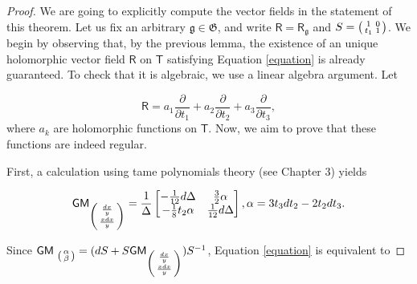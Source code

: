 \documentclass[10pt,a4paper]{amsart}
\begin{document}
\begin{proof}
We are going to explicitly compute the vector fields in the statement of this theorem. Let us fix an arbitrary $\mathfrak{g}\in \mathfrak{G}$, and write $\mathsf{R}=\mathsf{R}_{\mathfrak{g}}$ and $S=\begin{psmallmatrix}1 & 0\\  t_1 & 1\end{psmallmatrix}$. We begin by observing that, by the previous lemma, the existence of an unique holomorphic vector field $\mathsf{R}$ on $\mathsf{T}$ satisfying Equation \ref{equation} is already guaranteed. To check that it is algebraic, we use a linear algebra argument. Let 

\begin{equation}
\mathsf{R}=a_1\frac{\partial}{\partial t_1}+ a_2\frac{\partial}{\partial t_2}+a_3\frac{\partial}{\partial t_3}, 
\end{equation} 
where $a_k$ are holomorphic functions on $\mathsf{T}$. Now, we aim to prove that these functions are indeed regular.

First, a calculation using tame polynomials theory (see Chapter 3) yields

\begin{equation}
\mathsf{GM}_{\begin{psmallmatrix}\frac{dx}{y}\\ \frac{xdx}{y}\end{psmallmatrix}}=
\frac{1}{\Delta}\begin{bmatrix}
-\frac{1}{12}d\Delta & \frac{3}{2} \alpha\\
-\frac{1}{8}t_2\alpha & \frac{1}{12}d\Delta 
\end{bmatrix}, \alpha=3t_3dt_2-2t_2dt_3.
\end{equation}

Since $\mathsf{GM}_{\
\begin{psmallmatrix}\alpha\\\beta
\end{psmallmatrix}
}=(dS+S\mathsf{GM}_{\begin{psmallmatrix}\frac{dx}{y}\\ \frac{xdx}{y}\end{psmallmatrix}})S^{-1}$, Equation \ref{equation} is equivalent to 



\end{proof}
\end{document}
